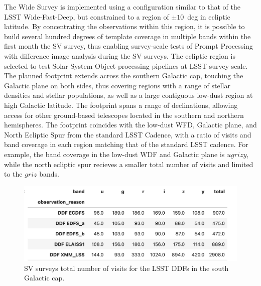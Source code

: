 The Wide Survey is implemented using a configuration similar to that of the LSST Wide-Fast-Deep, but constrained to a region of $\pm10$~deg in ecliptic latitude.
By concentrating the observations within this region, it is possible to build several hundred degrees of template coverage in multiple bands within the first month the SV survey, thus enabling survey-scale tests of Prompt Processing with difference image analysis during the SV surveys.
The ecliptic region is selected to test Solar System Object processing pipelines at LSST survey scale.
The planned footprint extends across the southern Galactic cap, touching the Galactic plane on both sides, thus covering regions with a range of stellar densities and stellar populations, as well as a large contiguous low-dust region at high Galactic latitude.
The footprint spans a range of declinations, allowing access for other ground-based telescopes located in the southern and northern hemispheres.
The footprint coincides with the low-dust WFD, Galactic plane, and North Ecliptic Spur from the standard LSST Cadence, with a ratio of visits and band coverage in each region matching that of the standard LSST cadence.
For example, the band coverage in the low-dust WDF and Galactic plane is $ugrizy$, while the north ecliptic spur recieves a smaller total number of visits and limited to the $griz$ bands.

\begin{figure}[htbp]
    \begin{center}
    \includegraphics[width=1\textwidth]{./sv_surveys_ddf_visits.png}
    \caption{SV surveys total number of visits for the LSST DDFs in the south Galactic cap.}
    \label{sv_surveys_ddf_visits}
    \end{center}
\end{figure}

